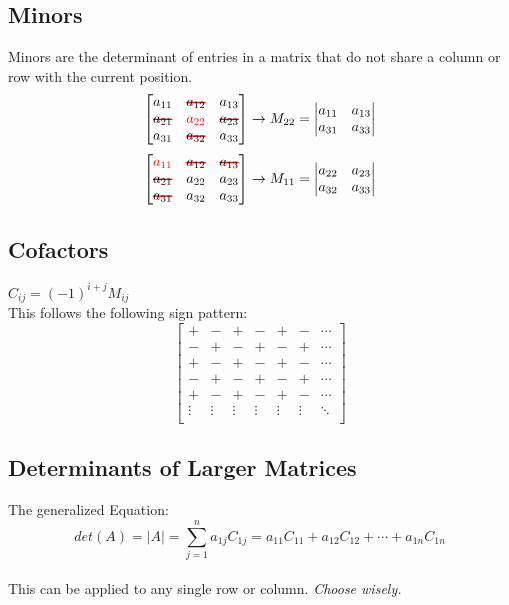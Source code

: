 \documentclass[]{article}
\newcommand\hcancel[2][black]{\setbox0=\hbox{$#2$}%
	\rlap{\raisebox{.45\ht0}{\textcolor{#1}{\rule{\wd0}{1pt}}}}#2}
\begin{document}
\subsection{Minors}
Minors are the determinant of entries in a matrix that do not share a column or row with the current position. \\
$$
\begin{bmatrix}
	a_{11} & \hcancel[red]{a_{12}} & a_{13} \\
	\hcancel[red]{a_{21}} & \textcolor{red}{a_{22}} & \hcancel[red]{a_{23}} \\
	a_{31} & \hcancel[red]{a_{32}} & a_{33} \\
\end{bmatrix}
\rightarrow
M_{22} = 
\begin{vmatrix}
	a_{11} & a_{13} \\
	a_{31} & a_{33} \\
\end{vmatrix}
$$
$$
\begin{bmatrix}
	\textcolor{red}{a_{11}} & \hcancel[red]{a_{12}} & \hcancel[red]{a_{13}} \\
	\hcancel[red]{a_{21}} & a_{22} & a_{23} \\
	\hcancel[red]{a_{31}} & a_{32} & a_{33} \\
\end{bmatrix}
\rightarrow
M_{11} = 
\begin{vmatrix}
	a_{22} & a_{23} \\
	a_{32} & a_{33} \\
\end{vmatrix}
$$
\subsection{Cofactors}
$ C_{ij} = (-1)^{i+j} M_{ij} $ \\
This follows the following sign pattern: \\
$$
	\begin{bmatrix}
		+&-&+&-&+&-&\cdots\\
		-&+&-&+&-&+&\cdots\\
		+&-&+&-&+&-&\cdots\\
		-&+&-&+&-&+&\cdots\\
		+&-&+&-&+&-&\cdots\\
		\vdots&\vdots&\vdots&\vdots&\vdots&\vdots&\ddots\\
	\end{bmatrix}
$$
\subsection{Determinants of Larger Matrices}
The generalized Equation: \\
$$
det(A) = |A| =
\sum_{j=1}^{n}a_{1j}C_{1j} = 
a_{11}C_{11} + a_{12}C_{12} + \cdots + a_{1n}C_{1n}
$$ \\
This can be applied to any single row or column. \emph{Choose wisely.}
\end{document}
